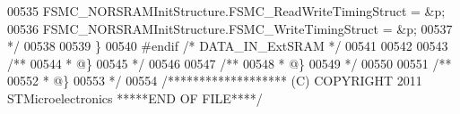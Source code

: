\begin{DoxyCode}
00535 \textcolor{comment}{  FSMC\_NORSRAMInitStructure.FSMC\_ReadWriteTimingStruct = &p;}
00536 \textcolor{comment}{  FSMC\_NORSRAMInitStructure.FSMC\_WriteTimingStruct = &p;}
00537 \textcolor{comment}{*/}
00538 
00539 \}
00540 \textcolor{preprocessor}{#}\textcolor{preprocessor}{endif} \textcolor{comment}{/* DATA\_IN\_ExtSRAM */}
00541 
00542 
00543 \textcolor{comment}{/**}
00544 \textcolor{comment}{  * @\}}
00545 \textcolor{comment}{  */}
00546 
00547 \textcolor{comment}{/**}
00548 \textcolor{comment}{  * @\}}
00549 \textcolor{comment}{  */}
00550 
00551 \textcolor{comment}{/**}
00552 \textcolor{comment}{  * @\}}
00553 \textcolor{comment}{  */}
00554 \textcolor{comment}{/******************* (C) COPYRIGHT 2011 STMicroelectronics *****END OF FILE****/}
\end{DoxyCode}
